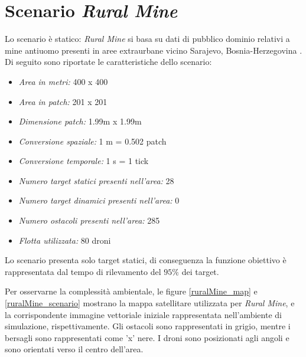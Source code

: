 \section{Scenario \textit{Rural Mine}}

Lo scenario è statico: \textit{Rural Mine} si basa su dati di pubblico dominio relativi a mine antiuomo presenti in aree extraurbane vicino Sarajevo, Bosnia-Herzegovina \cite{seedemining2018}.
Di seguito sono riportate le caratteristiche dello scenario:

\begin{itemize}
    \item \textit{Area in metri:} 400 x 400
    \item \textit{Area in patch:} 201 x 201
    \item \textit{Dimensione patch:} 1.99m x 1.99m
    \item \textit{Conversione spaziale:} 1 m = 0.502 patch
    \item \textit{Conversione temporale:} 1 s = 1 tick
    \item \textit{Numero target statici presenti nell'area:} 28
    \item \textit{Numero target dinamici presenti nell'area:} 0
    \item \textit{Numero ostacoli presenti nell'area:} 285
    \item \textit{Flotta utilizzata:} 80 droni
\end{itemize}

Lo scenario presenta solo target statici, di conseguenza la funzione obiettivo è rappresentata dal tempo di rilevamento del $95 \%$ dei target.

Per osservarne la complessità ambientale, le figure \ref{ruralMine_map} e \ref{ruralMine_scenario} mostrano la mappa satellitare utilizzata per \textit{Rural Mine}, e la corrispondente immagine vettoriale iniziale rappresentata nell'ambiente di simulazione, rispettivamente. 
Gli ostacoli  sono rappresentati in grigio, mentre i bersagli sono rappresentati come 'x' nere. 
I droni sono posizionati agli angoli e sono orientati verso il centro dell'area.

